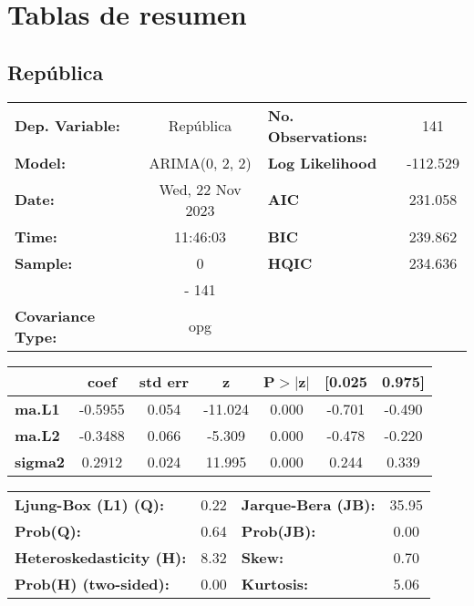 \documentclass{article}%
\begin{document}
%
\section{Tablas de resumen}%
\label{sec:Tablasderesumen}%
\subsection*{República}%
\begin{center}
\begin{tabular}{lclc}
\toprule
\textbf{Dep. Variable:}          &    República     & \textbf{  No. Observations:  } &    141      \\
\textbf{Model:}                  &  ARIMA(0, 2, 2)  & \textbf{  Log Likelihood     } &  -112.529   \\
\textbf{Date:}                   & Wed, 22 Nov 2023 & \textbf{  AIC                } &  231.058    \\
\textbf{Time:}                   &     11:46:03     & \textbf{  BIC                } &  239.862    \\
\textbf{Sample:}                 &        0         & \textbf{  HQIC               } &  234.636    \\
\textbf{}                        &       - 141      & \textbf{                     } &             \\
\textbf{Covariance Type:}        &       opg        & \textbf{                     } &             \\
\bottomrule
\end{tabular}
\begin{tabular}{lcccccc}
                & \textbf{coef} & \textbf{std err} & \textbf{z} & \textbf{P$> |$z$|$} & \textbf{[0.025} & \textbf{0.975]}  \\
\midrule
\textbf{ma.L1}  &      -0.5955  &        0.054     &   -11.024  &         0.000        &       -0.701    &       -0.490     \\
\textbf{ma.L2}  &      -0.3488  &        0.066     &    -5.309  &         0.000        &       -0.478    &       -0.220     \\
\textbf{sigma2} &       0.2912  &        0.024     &    11.995  &         0.000        &        0.244    &        0.339     \\
\bottomrule
\end{tabular}
\begin{tabular}{lclc}
\textbf{Ljung-Box (L1) (Q):}     & 0.22 & \textbf{  Jarque-Bera (JB):  } & 35.95  \\
\textbf{Prob(Q):}                & 0.64 & \textbf{  Prob(JB):          } &  0.00  \\
\textbf{Heteroskedasticity (H):} & 8.32 & \textbf{  Skew:              } &  0.70  \\
\textbf{Prob(H) (two-sided):}    & 0.00 & \textbf{  Kurtosis:          } &  5.06  \\
\bottomrule
\end{tabular}
\end{center}
\end{document}
